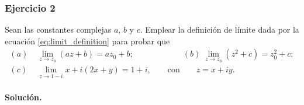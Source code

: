 \documentclass[a4paper]{report}
\begin{document}
\subsubsection{Ejercicio 2}

Sean las constantes complejas \(a\), \(b\) y \(c\). Emplear la definición de límite dada por la ecuación \ref{eq:limit_definition} para probar que 
\begin{align*}
 (\textit{a})\;&\lim_{z\to z_0}(az+b)=az_0+b;\qquad\qquad\qquad
 (\textit{b})\;\lim_{z\to z_0}(z^2+c)=z_0^2+c;\\
 (\textit{c})\;&\lim_{z\to1-i}x+i(2x+y)=1+i,\qquad\textrm{con}\qquad z=x+iy.
\end{align*}

\paragraph{Solución.} 
\end{document}
